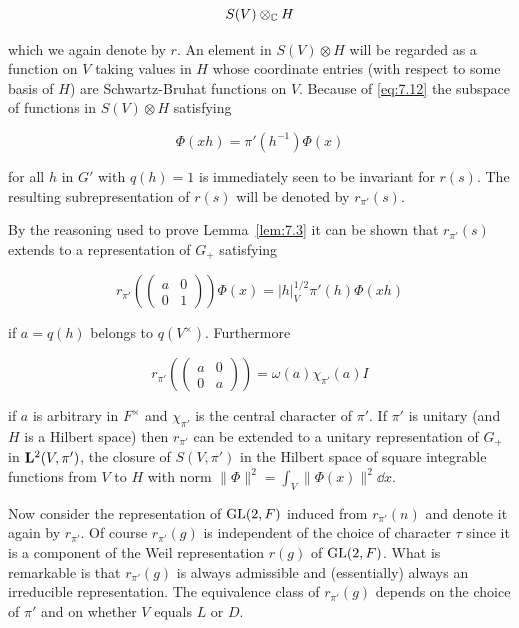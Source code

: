 \[
S(V) \otimes_{\mathbb{C}} H
\]

which we again denote by $r$. An element in $S(V) \otimes H$ will be regarded as a function on $V$ taking values in $H$ whose coordinate entries (with respect to some basis of $H$) are Schwartz-Bruhat functions on $V$. Because of \eqref{eq:7.12} the subspace of functions in $S(V) \otimes H$ satisfying

\begin{equation}\label{eq:7.15}
\Phi(xh) = \pi'(h^{-1})\Phi(x)\tag{7.15}
\end{equation}

for all $h$ in $G'$ with $q(h) = 1$ is immediately seen to be invariant for $r(s)$. The resulting subrepresentation of $r(s)$ will be denoted by $r_{\pi'}(s)$.

By the reasoning used to prove Lemma~\ref{lem:7.3} it can be shown that $r_{\pi'}(s)$ extends to a representation of $G_+$ satisfying

\begin{equation}\label{eq:7.16}
r_{\pi'}\left(\begin{pmatrix} a & 0 \\ 0 & 1 \end{pmatrix}\right)\Phi(x) = |h|_V^{1/2}\pi'(h)\Phi(xh)\tag{7.16}
\end{equation}

if $a = q(h)$ belongs to $q(V^{\times})$. Furthermore

\[
r_{\pi'}\left(\begin{pmatrix} a & 0 \\ 0 & a \end{pmatrix}\right) = \omega(a)\chi_{\pi'}(a)I
\]

if $a$ is arbitrary in $F^{\times}$ and $\chi_{\pi'}$ is the central character of $\pi'$. If $\pi'$ is unitary (and $H$ is a Hilbert space) then $r_{\pi'}$ can be extended to a unitary representation of $G_+$ in $\mathbf{L}^2(V,\pi')$, the closure of $S(V,\pi')$ in the Hilbert space of square integrable functions from $V$ to $H$ with norm $\|\Phi\|^2 = \int_V \|\Phi(x)\|^2 \dd x$.

Now consider the representation of $\operatorname{GL}(2,F)$ induced from $r_{\pi'}(n)$ and denote it again by $r_{\pi'}$. Of course $r_{\pi'}(g)$ is independent of the choice of character $\tau$ since it is a component of the Weil representation $r(g)$ of $\operatorname{GL}(2,F)$. What is remarkable is that $r_{\pi'}(g)$ is always admissible and (essentially) always an irreducible representation. The equivalence class of $r_{\pi'}(g)$ depends on the choice of $\pi'$ and on whether $V$ equals $L$ or $D$.

